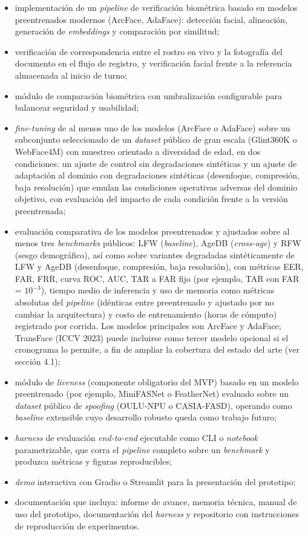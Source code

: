 \documentclass[
  11pt, %
]{charter}
\begin{document}
\begin{itemize}
  \item implementación de un \textit{pipeline} de verificación biométrica basado en modelos preentrenados modernos (ArcFace, AdaFace): detección facial, alineación, generación de \textit{embeddings} y comparación por similitud;
  \item verificación de correspondencia entre el rostro en vivo y la fotografía del documento en el flujo de registro, y verificación facial frente a la referencia almacenada al inicio de turno;
  \item módulo de comparación biométrica con umbralización configurable para balancear seguridad y usabilidad;
  \item \textit{fine-tuning} de al menos uno de los modelos (ArcFace o AdaFace) sobre un subconjunto seleccionado de un \textit{dataset} público de gran escala (Glint360K o WebFace4M) con muestreo orientado a diversidad de edad, en dos condiciones: un ajuste de control sin degradaciones sintéticas y un ajuste de adaptación al dominio con degradaciones sintéticas (desenfoque, compresión, baja resolución) que emulan las condiciones operativas adversas del dominio objetivo, con evaluación del impacto de cada condición frente a la versión preentrenada;
  \item evaluación comparativa de los modelos preentrenados y ajustados sobre al menos tres \textit{benchmarks} públicos: LFW (\textit{baseline}), AgeDB (\textit{cross-age}) y RFW (sesgo demográfico), así como sobre variantes degradadas sintéticamente de LFW y AgeDB (desenfoque, compresión, baja resolución), con métricas EER, FAR, FRR, curva ROC, AUC, TAR a FAR fijo (por ejemplo, TAR con FAR = $10^{-3}$), tiempo medio de inferencia y uso de memoria como métricas absolutas del \textit{pipeline} (idénticas entre preentrenado y ajustado por no cambiar la arquitectura) y costo de entrenamiento (horas de cómputo) registrado por corrida. Los modelos principales son ArcFace y AdaFace; TransFace (ICCV 2023) puede incluirse como tercer modelo opcional si el cronograma lo permite, a fin de ampliar la cobertura del estado del arte (ver sección 4.1);
  \item módulo de \textit{liveness} (componente obligatorio del MVP) basado en un modelo preentrenado (por ejemplo, MiniFASNet o FeatherNet) evaluado sobre un \textit{dataset} público de \textit{spoofing} (OULU-NPU o CASIA-FASD), operando como \textit{baseline} extensible cuyo desarrollo robusto queda como trabajo futuro;
  \item \textit{harness} de evaluación \textit{end-to-end} ejecutable como CLI o \textit{notebook} parametrizable, que corra el \textit{pipeline} completo sobre un \textit{benchmark} y produzca métricas y figuras reproducibles;
  \item \textit{demo} interactiva con Gradio o Streamlit para la presentación del prototipo;
  \item documentación que incluya: informe de avance, memoria técnica, manual de uso del prototipo, documentación del \textit{harness} y repositorio con instrucciones de reproducción de experimentos.
\end{itemize}
\end{document}
